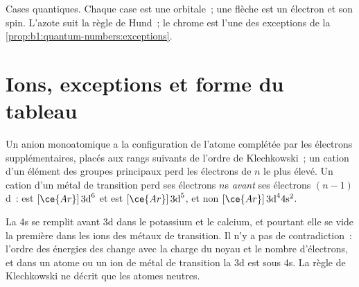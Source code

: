 \begin{omfigure}

{\small Cases quantiques. Chaque case est une orbitale~; une flèche est
un électron et son spin. L'azote suit la règle de Hund~; le chrome est
l'une des exceptions de la \cref{prop:b1:quantum-numbers:exceptions}.}
\end{omfigure}

\section{Ions, exceptions et forme du tableau}

\begin{proposition}\label{prop:b1:quantum-numbers:ions}
Un anion monoatomique a la configuration de l'atome complétée par les
électrons supplémentaires, placés aux rangs suivants de l'ordre de
Klechkowski~; un cation d'un élément des groupes principaux perd les
électrons de $n$ le plus élevé. Un cation d'un métal de transition perd
ses électrons $n$s \emph{avant} ses électrons
$(n-1)$d~:  est $[\ce{Ar}]\,3\text{d}^6$ et
 est $[\ce{Ar}]\,3\text{d}^5$, et non $[\ce{Ar}]\,3\text{d}^4
4\text{s}^2$.
\end{proposition}
\admitted

\begin{remark}\label{rem:b1:quantum-numbers:order}
La  4s se remplit avant 3d dans le potassium et le calcium,
et pourtant elle se vide la première dans les ions des métaux de
transition. Il n'y a pas de contradiction~: l'ordre des énergies des
 change avec la charge du noyau et le nombre d'électrons, et
dans un atome ou un ion de métal de transition la  3d est
sous 4s. La règle de Klechkowski ne décrit que les atomes neutres.
\end{remark}

